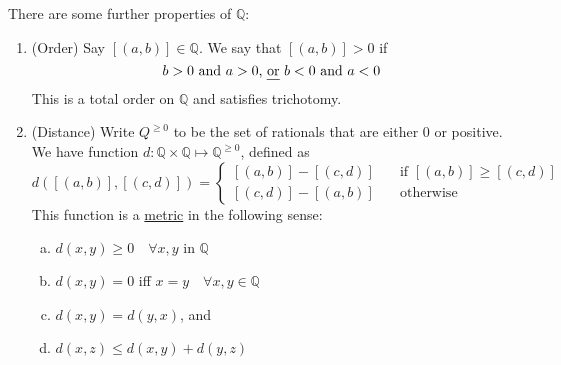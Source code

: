 \documentclass[12pt]{amsart}
\newcommand{\bbQ}{\mathbb{Q}}
\theoremstyle{plain}
\theoremstyle{remark}
\theoremstyle{definition}
\begin{document}
\par
There are some further properties of $\bbQ$:
\begin{enumerate}[(1)]
	\item (Order)
		Say $[(a,b)]\in \bbQ$. We say that $[(a,b)] > 0$ if 
		\begin{equation*}
			b > 0 \mbox{ and } a > 0 \mbox{, \ul{or} } b < 0 \mbox{ and } a < 0
		\end{equation*}
		This is a total order on $\bbQ$ and satisfies trichotomy.
	\item (Distance)
		Write $Q^{\geqslant 0}$ to be the set of rationals that are either $0$ or positive. We have  function $d: \bbQ \times \bbQ \mapsto \bbQ^{\geqslant 0}$, defined as 
		\begin{equation*}
			d([(a,b)],[(c,d)]) = 
			\begin{cases}
				[(a,b)] - [(c,d)] \quad &\mbox{if } [(a,b)] \geqslant [(c,d)]\\	
				[(c,d)] - [(a,b)] \quad &\mbox{otherwise}
			\end{cases}
		\end{equation*}
		This function is a \ul{metric} in the following sense:
		\begin{enumerate}[a.]
			\item $d(x,y)\geqslant 0 \quad \forall x,y \mbox{ in } \bbQ$
			\item $d(x,y) = 0$ iff $x = y \quad \forall x,y \in \bbQ$ 
			\item $d(x,y) = d(y,x)$, and 
			\item $d(x,z) \leqslant d(x,y) + d(y,z)$
		\end{enumerate}
\end{enumerate}
\end{document}
